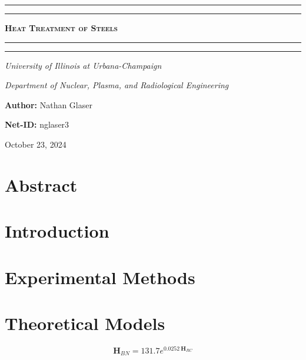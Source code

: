 \documentclass{article}
\begin{document}
\newcommand{\Fig}[3]{\begin{figure}[!h!]\centering\texttt{[image: \#1]}\caption{#2}\label{#3}\end{figure}}
\begin{titlepage}

\centering
\scshape
\vspace{\baselineskip}

%
\rule{\textwidth}{1.6pt}\vspace*{-\baselineskip}\vspace*{2pt}
\rule{\textwidth}{0.4pt}

{\Huge \textbf{\textsc{ Heat Treatment of Steels \\
\vspace{15pt}}}}

\rule{\textwidth}{0.4pt}\vspace*{-\baselineskip}\vspace{3.2pt}
\rule{\textwidth}{1.6pt}\vspace{6pt}
\centerline{\textit{University of Illinois at Urbana-Champaign}} 
\centerline{\textit{Department of Nuclear, Plasma, and Radiological Engineering}}
\vspace{1.5\baselineskip}


\large \centerline{\textbf{Author:} Nathan Glaser}
\large \centerline{\textbf{Net-ID:} nglaser3}
\quad

\vfill
\large \centerline{October 23, 2024}
%
\end{titlepage}

\tableofcontents
\newpage
{}

\section{Abstract}

\section{Introduction}

\section{Experimental Methods}

\section{Theoretical Models}
\begin{equation}
    \textbf{H}_{BN} = 131.7 e^{0.0252\:\textbf{H}_{RC}}
    \label{eq:rc2br}
\end{equation}
\end{document}
